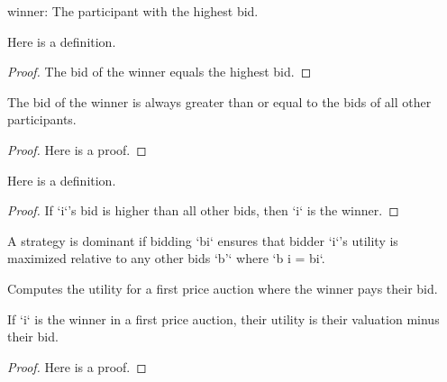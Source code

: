 \begin{definition}\label{winner}
    \leanok
    winner: The participant with the highest bid.
\end{definition}

\begin{lemma}\label{bid_winner_eq_maxBid}
    \leanok
    Here is a definition.
\end{lemma}
\begin{proof}
    The bid of the winner equals the highest bid.
\end{proof}

\begin{lemma}\label{bid_le_bid_winner}
    \leanok
    The bid of the winner is always greater than or equal to the bids of all other participants.
\end{lemma}
\begin{proof}
    Here is a proof.
\end{proof}

\begin{lemma}\label{eq_winner_of_bid_gt}
    \leanok
    Here is a definition.
\end{lemma}
\begin{proof}
    If `i`'s bid is higher than all other bids, then `i` is the winner.
\end{proof}

\begin{definition}\label{dominant}
    \leanok
    A strategy is dominant if bidding `bi` ensures that bidder `i`'s utility is maximized relative to any other bids `b'` where `b i = bi`.
\end{definition}

\begin{definition}\label{FirstPrice.utility}
    \leanok
    Computes the utility for a first price auction where the winner pays their bid.
\end{definition}

\begin{lemma}\label{FirstPrice.utility_winner}
    \leanok
    If `i` is the winner in a first price auction, their utility is their valuation minus their bid.
\end{lemma}
\begin{proof}
    Here is a proof.
\end{proof}

